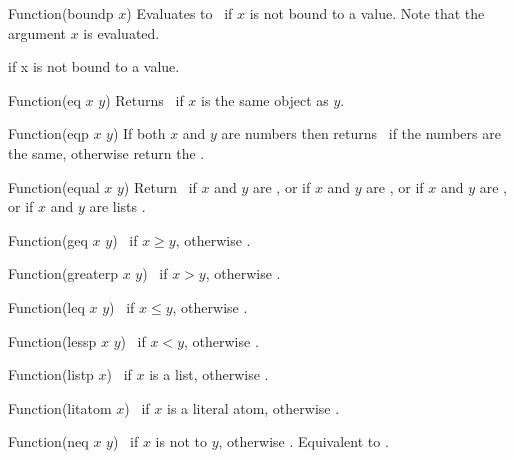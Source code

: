 \begin{defun}{Function}{(boundp $x$)}
  Evaluates to \T\ if $x$ is not bound to a value. Note that the
  argument $x$ is evaluated.


  if x is not bound to a value.
\end{defun}

\begin{defun}{Function}{(eq $x$ $y$)}
  Returns \T\ if $x$ is the same object as $y$.
\end{defun}

\begin{defun}{Function}{(eqp $x$ $y$)}
  If both $x$ and $y$ are numbers then  returns \T\ if the
  numbers are the same, otherwise return the .
\end{defun}

\begin{defun}{Function}{(equal $x$ $y$)}
  Return \T\ if $x$ and $y$ are , or if $x$ and $y$ are
  , or if $x$ and $y$ are , or if $x$ and $y$
  are lists .
\end{defun}

\begin{defun}{Function}{(geq $x$ $y$)}
  \T\ if $x \ge y$, otherwise \NIL.
\end{defun}

\begin{defun}{Function}{(greaterp $x$ $y$)}
  \T\ if $x > y$, otherwise \NIL.
\end{defun}


\begin{defun}{Function}{(leq $x$ $y$)}
  \T\ if $x \le y$, otherwise \NIL.
\end{defun}

\begin{defun}{Function}{(lessp $x$ $y$)}
  \T\ if $x < y$, otherwise \NIL.
\end{defun}

\begin{defun}{Function}{(listp $x$)}
  \T\ if $x$ is a list, otherwise \NIL.
\end{defun}

\begin{defun}{Function}{(litatom $x$)}
  \T\ if $x$ is a literal atom, otherwise \NIL.
\end{defun}

\begin{defun}{Function}{(neq $x$ $y$)}
  \T\ if $x$ is not  to $y$, otherwise \NIL. Equivalent to
  .
\end{defun}

